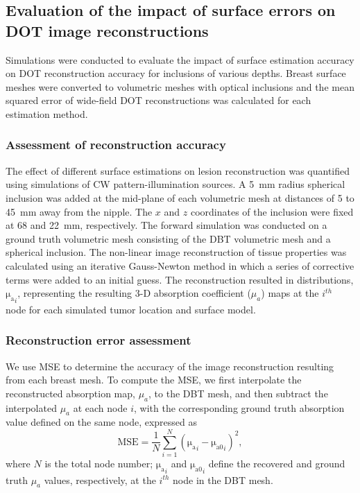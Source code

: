 \subsection{Evaluation of the impact of surface errors on DOT image reconstructions}
Simulations were conducted to evaluate the impact of surface estimation accuracy on \ac{DOT} reconstruction accuracy for inclusions of various depths. Breast surface meshes were converted to volumetric meshes with optical inclusions and the mean squared error of wide-field \ac{DOT} reconstructions was calculated for each estimation method. 

\subsubsection{Assessment of reconstruction accuracy}
The effect of different surface estimations on lesion reconstruction was quantified using simulations of \ac{CW} pattern-illumination sources. A 5~mm radius spherical inclusion was added at the mid-plane of each volumetric mesh at distances of 5 to 45~mm away from the nipple. The $x$ and $z$ coordinates of the inclusion were fixed at 68 and 22~mm, respectively. The forward simulation was conducted on a ground truth volumetric mesh consisting of the \ac{DBT} volumetric mesh and a spherical inclusion. The non-linear image reconstruction of tissue properties was calculated using an iterative Gauss-Newton method in which a series of corrective terms were added to an initial guess. The reconstruction resulted in distributions, $\mathrm{\mu_{a}}_{i}$, representing the resulting 3-D absorption coefficient ($\mu_a$) maps at the $i^{th}$ node for each simulated tumor location and surface model.

\subsubsection{Reconstruction error assessment}
We use \ac{MSE} to determine the accuracy of the image reconstruction resulting from each breast mesh. To compute the \ac{MSE}, we first interpolate the reconstructed absorption map, $\mu_a$, to the \ac{DBT} mesh, and then subtract the interpolated $\mu_a$ at each node $i$, with the corresponding ground truth absorption value defined on the same node, expressed as
\begin{equation}
\label{eq:mse}
\mathrm{MSE} = \frac{1}{N}\sum_{i=1}^{N}(\mathrm{\mu_{a}}_{i} - \mathrm{\mu_{a0}}_i)^{2},
\end{equation}
where $N$ is the total node number; $\mathrm{\mu_{a}}_i$ and $\mathrm{\mu_{a0}}_i$ define the recovered and ground truth $\mu_{a}$ values, respectively, at the $i^{th}$ node in the \ac{DBT} mesh.



